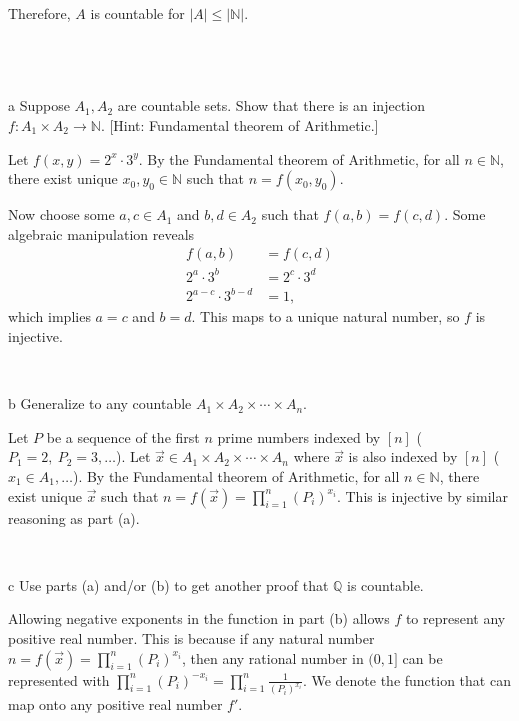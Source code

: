 \documentclass{article}
\begin{document}
Therefore, $A$ is countable for $|A|\leq |\mathbb{N} |$.


\
\hline
\section{}

\begin{problem} a
Suppose $A_1,A_2$ are countable sets. Show that there is an injection $f:A_1\times A_2\to \mathbb{N}$. [Hint: Fundamental theorem of Arithmetic.]
\end{problem}

Let $f( x,y) =2^{x} \cdot 3^{y}$. By the Fundamental theorem of Arithmetic, for all $n\in \mathbb{N}$, there exist unique $x_{0} ,y_{0} \in \mathbb{N}$ such that $n=f( x_{0} ,y_{0})$. 

Now choose some $a,c\in A_{1}$ and $b,d\in A_{2}$ such that $f( a,b) =f( c,d)$. Some algebraic manipulation reveals
\begin{align*}
f( a,b) & =f( c,d)\\
2^{a} \cdot 3^{b} & =2^{c} \cdot 3^{d}\\
2^{a-c} \cdot 3^{b-d} & =1,
\end{align*}
which implies $a=c$ and $b=d$. This maps to a unique natural number, so $f$ is injective.

\

\begin{problem} b
Generalize to any countable $A_1\times A_2\times \cdots \times A_n$.
\end{problem}

Let $P$ be a sequence of the first $n$ prime numbers indexed by $[ n]$ ($P_{1} =2,\ P_{2} =3,\dotsc $). Let $\vec{x} \in A_{1} \times A_{2} \times \cdots \times A_{n}$ where $\vec{x}$ is also indexed by $[ n]$ ($x_{1} \in A_{1} ,\dotsc $). By the Fundamental theorem of Arithmetic, for all $n\in \mathbb{N}$, there exist unique $\vec{x}$ such that $n=f(\vec{x}) =\prod _{i=1}^{n}( P_{i})^{x_{i}}$. This is injective by similar reasoning as part (a). 

\

\begin{problem} c
Use parts (a) and/or (b) to get another proof that $\mathbb{Q}$ is countable.
\end{problem}

Allowing negative exponents in the function in part (b) allows $f$ to represent any positive real number. This is because if any natural number $n=f(\vec{x}) =\prod _{i=1}^{n}( P_{i})^{x_{i}}$, then any rational number in $( 0,1]$ can be represented with $\prod _{i=1}^{n}( P_{i})^{-x_{i}} =\prod _{i=1}^{n}\frac{1}{( P_{i})^{x_{i}}}$. We denote the function that can map onto any positive real number $f'$.
\end{document}

